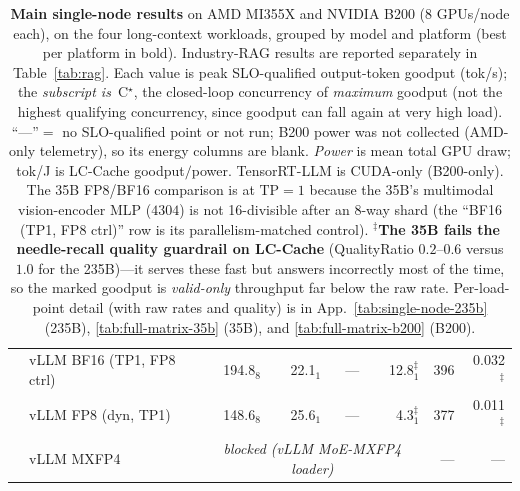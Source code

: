 \begin{table}[t]
\begin{tabular}{@{}l l r r r r r r@{}}
      & vLLM BF16 (TP1, FP8 ctrl) & 194.8$_{8}$  & 22.1$_{1}$  & ---   & 12.8$_{1}^\ddagger$  & 396 & 0.032$^\ddagger$ \\
      & vLLM FP8 (dyn, TP1)  & 148.6$_{8}$  & 25.6$_{1}$  & ---   & 4.3$_{1}^\ddagger$   & 377 & 0.011$^\ddagger$ \\
      & vLLM MXFP4           & \multicolumn{4}{c}{\emph{blocked (vLLM MoE-MXFP4 loader)}} & --- & --- \\
    \bottomrule
  \end{tabular}
  \caption{\textbf{Main single-node results} on AMD MI355X and NVIDIA B200
  (8 GPUs/node each), on the four long-context workloads, grouped by model and
  platform (best per platform in bold). Industry-RAG results are reported separately
  in Table~\ref{tab:rag}. Each value is peak SLO-qualified output-token goodput
  (tok/s); the \emph{subscript is}~C$^\star$, the closed-loop concurrency of
  \emph{maximum} goodput (not the highest qualifying concurrency, since goodput can
  fall again at very high load). ``---''$=$ no SLO-qualified point or not run; B200
  power was not collected (AMD-only telemetry), so its energy columns are blank.
  \emph{Power} is mean total GPU draw; tok/J is LC-Cache goodput$/$power.
  TensorRT-LLM is CUDA-only (B200-only).
  The 35B FP8/BF16 comparison is at $\text{TP}{=}1$ because the 35B's multimodal
  vision-encoder MLP ($4304$) is not 16-divisible after an 8-way shard
  (the ``BF16 (TP1, FP8 ctrl)'' row is its parallelism-matched control).
  $^\ddagger$\textbf{The 35B fails the needle-recall quality guardrail on LC-Cache}
  (QualityRatio $0.2$--$0.6$ versus $1.0$ for the 235B)---it serves these fast but
  answers incorrectly most of the time, so the marked goodput is \emph{valid-only}
  throughput far below the raw rate. Per-load-point detail (with raw rates and
  quality) is in App.~\ref{tab:single-node-235b} (235B),
  \ref{tab:full-matrix-35b} (35B), and \ref{tab:full-matrix-b200} (B200).}
  \label{tab:main}
\end{table}
